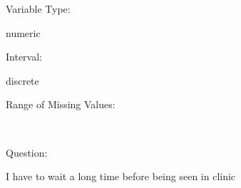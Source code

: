 \documentclass[
]{article}
\begin{document}
\begin{minipage}[t]{0.3\linewidth}

Variable Type:

\end{minipage}%
\begin{minipage}[t]{0.7\linewidth}

numeric

\end{minipage}

\begin{minipage}[t]{0.3\linewidth}

Interval:

\end{minipage}%
\begin{minipage}[t]{0.7\linewidth}

discrete

\end{minipage}

\begin{minipage}[t]{0.3\linewidth}

Range of Missing Values:

\end{minipage}%
\begin{minipage}[t]{0.7\linewidth}

~

\end{minipage}

\begin{minipage}[t]{0.3\linewidth}

Question:

\end{minipage}%
\begin{minipage}[t]{0.7\linewidth}

I have to wait a long time before being seen in clinic

\end{minipage}
\end{document}
